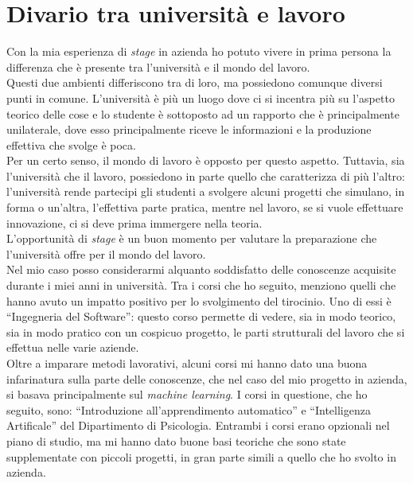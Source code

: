 \section{Divario tra università e lavoro}\label{sec:uni-work-diff}\noindent
Con la mia esperienza di \textit{stage} in azienda ho potuto vivere in prima persona la differenza che è presente tra l'università e il mondo del lavoro.\\
Questi due ambienti differiscono tra di loro, ma possiedono comunque diversi punti in comune. L'università è più un luogo dove ci si incentra più su l'aspetto teorico delle cose e lo studente è sottoposto ad un rapporto che è principalmente unilaterale, dove esso principalmente riceve le informazioni e la produzione effettiva che svolge è poca.\\
Per un certo senso, il mondo di lavoro è opposto per questo aspetto. Tuttavia, sia l'università che il lavoro, possiedono in parte quello che caratterizza di più l'altro: l'università rende partecipi gli studenti a svolgere alcuni progetti che simulano, in forma o un'altra, l'effettiva parte pratica, mentre nel lavoro, se si vuole effettuare innovazione, ci si deve prima immergere nella teoria.\\
L'opportunità di \textit{stage} è un buon momento per valutare la preparazione che l'università offre per il mondo del lavoro. \\ Nel mio caso posso considerarmi alquanto soddisfatto delle conoscenze acquisite durante i miei anni in università.
Tra i corsi che ho seguito, menziono quelli che hanno avuto un impatto positivo per lo svolgimento del tirocinio. Uno di essi è ``Ingegneria del Software'': questo corso permette di vedere, sia in modo teorico, sia in modo pratico con un cospicuo progetto, le parti strutturali del lavoro che si effettua nelle varie aziende.\\
Oltre a imparare metodi lavorativi, alcuni corsi mi hanno dato una buona infarinatura sulla parte delle conoscenze, che nel caso del mio progetto in azienda, si basava principalmente sul \textit{machine learning}. I corsi in questione, che ho seguito, sono: ``Introduzione all'apprendimento automatico'' e ``Intelligenza Artificale'' del Dipartimento di Psicologia. Entrambi i corsi erano opzionali nel piano di studio, ma mi hanno dato buone basi teoriche che sono state supplementate con piccoli progetti, in gran parte simili a quello che ho svolto in azienda.
\newpage